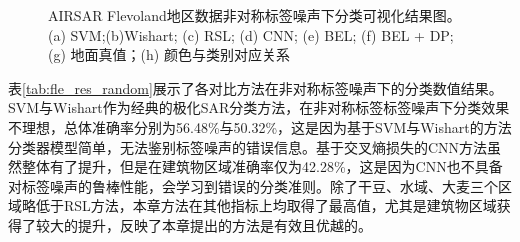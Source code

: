 \begin{figure}[ht!]

  \caption{AIRSAR Flevoland地区数据非对称标签噪声下分类可视化结果图。(a) SVM;(b)Wishart; (c) RSL; (d) CNN; (e) BEL; (f) BEL + DP; (g) 地面真值；(h) 颜色与类别对应关系}
  \label{fig:fle_random}
\end{figure}


表\ref{tab:fle_res_random}展示了各对比方法在非对称标签噪声下的分类数值结果。SVM与Wishart作为经典的极化SAR分类方法，在非对称标签标签噪声下分类效果不理想，总体准确率分别为56.48\%与50.32\%，这是因为基于SVM与Wishart的方法分类器模型简单，无法鉴别标签噪声的错误信息。基于交叉熵损失的CNN方法虽然整体有了提升，但是在建筑物区域准确率仅为42.28\%，这是因为CNN也不具备对标签噪声的鲁棒性能，会学习到错误的分类准则。除了干豆、水域、大麦三个区域略低于RSL方法，本章方法在其他指标上均取得了最高值，尤其是建筑物区域获得了较大的提升，反映了本章提出的方法是有效且优越的。

